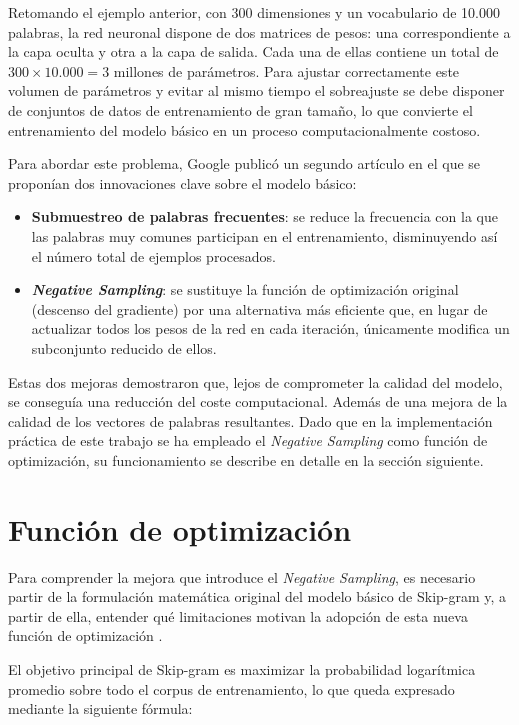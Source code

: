 Retomando el ejemplo anterior, con 300 dimensiones y un vocabulario de 10.000 palabras, la red neuronal dispone de dos matrices de pesos: una correspondiente a la capa oculta y otra a la capa de salida. Cada una de ellas contiene un total de $300 \times 10.000 = 3$ millones de parámetros. Para ajustar correctamente este volumen de parámetros y evitar al mismo tiempo el sobreajuste se debe disponer de conjuntos de datos de entrenamiento de gran tamaño, lo que convierte el entrenamiento del modelo básico en un proceso computacionalmente costoso.

Para abordar este problema, Google publicó un segundo artículo \cite{mikolov_skipgram_phrases_2013} en el que se proponían dos innovaciones clave sobre el modelo básico:

\begin{itemize}
  \item \textbf{Submuestreo de palabras frecuentes}: se reduce la frecuencia con la que las palabras muy comunes participan en el entrenamiento, disminuyendo así el número total de ejemplos procesados.
  \item \textbf{\textit{Negative Sampling}}: se sustituye la función de optimización original (descenso del gradiente) por una alternativa más eficiente que, en lugar de actualizar todos los pesos de la red en cada iteración, únicamente modifica un subconjunto reducido de ellos.
\end{itemize}

Estas dos mejoras demostraron que, lejos de comprometer la calidad del modelo, se conseguía una reducción del coste computacional. Además de una mejora de la calidad de los vectores de palabras resultantes. Dado que en la implementación práctica de este trabajo se ha empleado el \textit{Negative Sampling} como función de optimización, su funcionamiento se describe en detalle en la sección siguiente.

\section{Función de optimización}

Para comprender la mejora que introduce el \textit{Negative Sampling}, es necesario partir de la formulación matemática original del modelo básico de Skip-gram y, a partir de ella, entender qué limitaciones motivan la adopción de esta nueva función de optimización \cite{tsang_skipgram_review_medium}.

El objetivo principal de Skip-gram es maximizar la probabilidad logarítmica promedio sobre todo el corpus de entrenamiento, lo que queda expresado mediante la siguiente fórmula:

